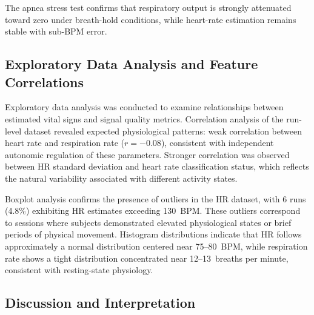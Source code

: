 \documentclass[conference]{IEEEtran}
\begin{document}
\begin{table}[t]
\centering
\caption{No-Breathing (Apnea) Test Results}
\label{tab:apnea_test}
\renewcommand{\arraystretch}{1.2}
\end{table}

The apnea stress test confirms that respiratory output is strongly attenuated toward zero under breath-hold conditions, while heart-rate estimation remains stable with sub-BPM error.

\subsection{Exploratory Data Analysis and Feature Correlations}

Exploratory data analysis was conducted to examine relationships between estimated vital signs and signal quality metrics. Correlation analysis of the run-level dataset revealed expected physiological patterns: weak correlation between heart rate and respiration rate ($r = -0.08$), consistent with independent autonomic regulation of these parameters. Stronger correlation was observed between HR standard deviation and heart rate classification status, which reflects the natural variability associated with different activity states.

Boxplot analysis confirms the presence of outliers in the HR dataset, with 6 runs (4.8\%) exhibiting HR estimates exceeding 130~BPM. These outliers correspond to sessions where subjects demonstrated elevated physiological states or brief periods of physical movement. Histogram distributions indicate that HR follows approximately a normal distribution centered near 75--80~BPM, while respiration rate shows a tight distribution concentrated near 12--13~breaths per minute, consistent with resting-state physiology.

\subsection{Discussion and Interpretation}
\end{document}
